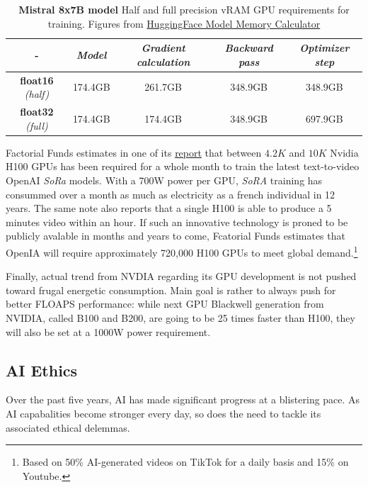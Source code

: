 \begin{table}[htp!]
  \caption{\textbf{ Mistral 8x7B model} Half and full precision vRAM GPU requirements for training. Figures from \href{https://huggingface.co/docs/accelerate/main/en/usage_guides/model_size_estimator}{HuggingFace Model Memory Calculator}}
  \label{tab:gs-mistral_requirement}
  \centering
  \begin{adjustbox}{width=\linewidth}
  \begin{tabular}[h]{c||cccc}
  \hline 
   - &  \textit{Model} & \textit{Gradient calculation} & \textit{Backward pass} & \textit{Optimizer step} \\
  \hline 
  \textbf{float16} \textit{(half)} & 174.4GB  & 261.7GB & 348.9GB & 348.9GB\\
  \textbf{float32} \textit{(full)} &  174.4GB  & 174.4GB & 348.9GB & 697.9GB \\
  \hline 
  \end{tabular}
  \end{adjustbox}
\end{table}
Factorial Funds estimates in one of its \href{https://www.factorialfunds.com/blog/under-the-hood-how-openai-s-sora-model-works}{report} that between $4.2K$ and $10K$ Nvidia H100 \ac{GPU}s has been required for a whole month to train the latest text-to-video OpenAI \textit{SoRa} models. With a 700W power per \ac{GPU}, \textit{SoRA} training has consummed over a month as much as electricity as a french individual in 12 years. The same note also reports that a single H100 is able to produce a 5 minutes video within an hour. If such an innovative technology is proned to be publicly avalable in months and years to come, Fcatorial Funds estimates that OpenIA will require approximately 720,000 H100 GPUs to meet global demand.\footnote{Based on 50\% \ac{AI}-generated videos on TikTok for a daily basis and 15\% on Youtube.}

Finally, actual trend from NVDIA regarding its \ac{GPU} development is not pushed toward frugal energetic consumption. Main goal is rather to always push for better FLOAPS performance: while next \ac{GPU} Blackwell generation from NVIDIA, called B100 and B200, are going to be 25 times faster than H100, they will also be set at a 1000W power requirement. 


\subsection{AI Ethics} 

Over the past five years, \ac{AI} has made significant progress at a blistering pace. As \ac{AI} capabalities become stronger every day, so does the need to tackle its associated ethical delemmas. 

